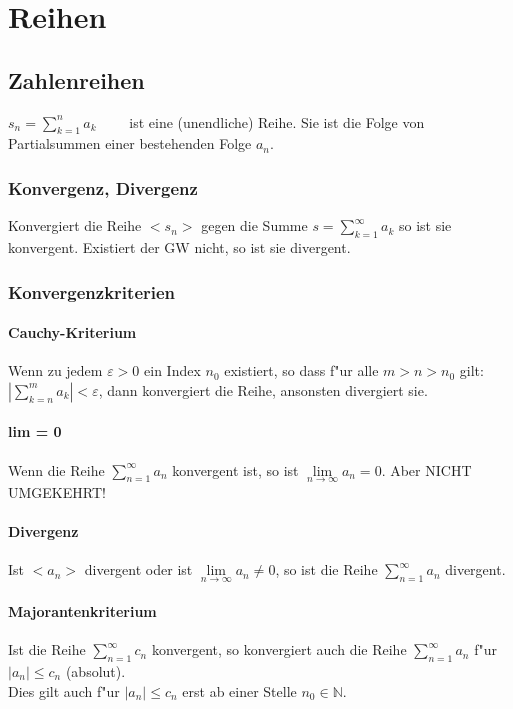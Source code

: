 \section{Reihen}

\subsection{Zahlenreihen}
  $ s_n = \sum\limits_{k=1}^{n} a_k \qquad $ ist eine (unendliche) Reihe. Sie
  ist die Folge von Partialsummen einer bestehenden Folge $a_n$.

\subsubsection{Konvergenz, Divergenz}
  Konvergiert die Reihe $< s_n >$ gegen die Summe $ s =
  \sum\limits_{k=1}^{\infty} a_k $ so ist sie konvergent. Existiert der GW nicht, so ist sie divergent.

\subsubsection{Konvergenzkriterien}

\paragraph{Cauchy-Kriterium} 
  Wenn zu jedem $\varepsilon > 0$ ein Index $n_0$ existiert, so dass f"ur alle
  $m > n > n_0$ gilt: \\ $\left| \sum\limits_{k=n}^m a_k \right| < \varepsilon$, dann konvergiert die Reihe, ansonsten divergiert sie.

\paragraph{lim = 0}
  Wenn die Reihe $ \sum\limits_{n=1}^{\infty} a_n $ konvergent ist, so ist
  $\lim\limits_{n \to \infty} a_n = 0$. \hspace{2cm} Aber NICHT UMGEKEHRT!

\paragraph{Divergenz}
  Ist $<a_n>$ divergent oder ist $\lim\limits_{n \to \infty} a_n \neq 0$, so
  ist die Reihe $ \sum\limits_{n=1}^{\infty} a_n $ divergent.

\paragraph{Majorantenkriterium}
  Ist die Reihe $ \sum\limits_{n=1}^{\infty} c_n $ konvergent, so konvergiert
  auch die Reihe $ \sum\limits_{n=1}^{\infty} a_n $ f"ur $|a_n| \leq c_n$ (absolut). \\ Dies gilt auch f"ur $|a_n| \leq c_n$ erst ab einer Stelle $n_0 \in \mathbb{N}$.

